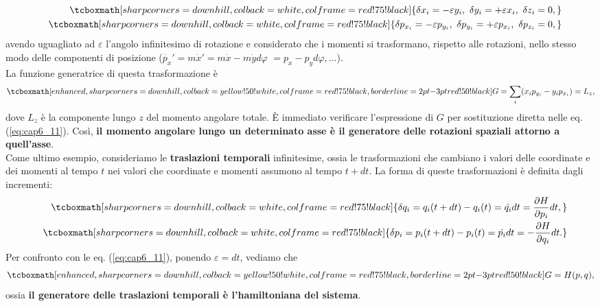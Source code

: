 	\begin{eqnarray}
			& & \tcboxmath[sharp corners=downhill ,colback=white,colframe=red!75!black]{\delta x_i = -\varepsilon y_i, \ \delta y_i = +\varepsilon x_i, \ \delta z_i =0,}\\
			& &\tcboxmath[sharp corners=downhill ,colback=white,colframe=red!75!black]{ \delta p_{x_i} = -\varepsilon p_{y_i}, \ \delta p_{y_i} = +\varepsilon p_{x_i}, \ \delta p_{z_i} =0,}
	\end{eqnarray}
avendo uguagliato ad $\varepsilon$ l'angolo infinitesimo di rotazione e considerato che i momenti si trasformano, rispetto alle rotazioni, nello stesso modo delle componenti di posizione ($\dot{p_x}'= m \dot{x}'=  m\dot{x}-m\dot{y}d\varphi$ $=p_x-p_yd\varphi , \dots$).\\
La funzione generatrice di questa trasformazione è
	\begin{equation}
		\tcboxmath[enhanced,sharp corners=downhill ,colback=yellow!50!white,colframe=red!75!black, borderline={2pt}{-3pt}{red!50!black}]{
			G= \sum _i (x_ip_{y_i} - y_i p_{x_i}) = L_z ,
			}
	\end{equation}
dove $L_z$ è la componente lungo $z$ del momento angolare totale. È immediato verificare l'espressione di $G$ per sostituzione diretta nelle eq. (\ref{eq:cap6_11}). Così, \textbf{il momento angolare lungo un determinato asse è il generatore delle rotazioni spaziali attorno a quell'asse}.\\

Come ultimo esempio, consideriamo le \textbf{traslazioni temporali} infinitesime, ossia le trasformazioni che cambiano i valori delle coordinate e dei momenti al tempo $t$ nei valori che coordinate e momenti assumono al tempo $t+dt$. La forma di queste trasformazioni è definita dagli incrementi:
	\begin{eqnarray}
		& &\tcboxmath[sharp corners=downhill ,colback=white,colframe=red!75!black]{
			\delta q_i = q_i(t+dt)-q_i(t) = \dot{q_i} dt = \frac{\partial H}{\partial p_i}dt,} \\
		& &\tcboxmath[sharp corners=downhill ,colback=white,colframe=red!75!black]{
			\delta p_i = p_i(t+dt)-p_i(t) = \dot{p_i} dt = -\frac{\partial H}{\partial q_i}dt. }
	\end{eqnarray}
Per confronto con le eq. (\ref{eq:cap6_11}), ponendo $\varepsilon = dt$, vediamo che
	\begin{equation}
		\tcboxmath[enhanced,sharp corners=downhill ,colback=yellow!50!white,colframe=red!75!black, borderline={2pt}{-3pt}{red!50!black}]{
			G=H(p,q) ,
			}
	\end{equation}
ossia \textbf{il generatore delle traslazioni temporali è l'hamiltoniana del sistema}.\\

